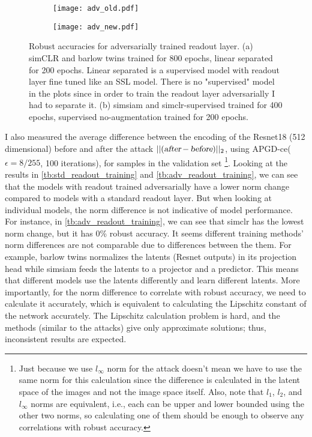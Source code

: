 \documentclass[../thesis.tex]{subfiles}
\begin{document}
	\begin{figure}[h!]
		\centering
		\begin{subfigure}{.5\textwidth}
			\centering
			\texttt{[image: adv\_old.pdf]}
			\caption{}
			\label{fig:sub1}
		\end{subfigure}%
		\begin{subfigure}{.5\textwidth}
			\centering
			\texttt{[image: adv\_new.pdf]}
			\caption{}
			\label{fig:sub2}
		\end{subfigure}
		\caption[Caption for LOF]{Robust accuracies for adversarially trained readout layer. (a) simCLR and barlow twins trained for 800 epochs, linear separated for 200 epochs. Linear separated is a supervised model with readout layer fine tuned like an SSL model. There is no "supervised" model in the plots since in order to train the readout layer adversarially I had to separate it. (b) simsiam and simclr-supervised trained for 400 epochs, supervised no-augmentation trained for 200 epochs.}
		\label{fig:adv_readout_training}
	\end{figure}
	
	I also measured the average difference between the encoding of the Resnet18 (512 dimensional) before and after the attack $||(\variablename{after}-\variablename{before} )||_2$, using APGD-ce($\epsilon=8/255$, 100 iterations), for samples in the validation set 
	\footnote{Just because we use $l_{\infty}$ norm for the attack doesn't mean we have to use the same norm for this calculation since the difference is calculated in the latent space of the images and not the image space itself. Also, note that $l_1$, $l_2$, and $l_{\infty}$ norms are equivalent, i.e., each can be upper and lower bounded using the other two norms, so calculating one of them should be enough to observe any correlations with robust accuracy.}. 
	Looking at the results in \ref{tb:std_readout_training} and \ref{tb:adv_readout_training}, we can see that the models with readout trained adversarially have a lower norm change compared to models with a standard readout layer. But when looking at individual models, the norm difference is not indicative of model performance. For instance, in \ref{tb:adv_readout_training}, we can see that simclr has the lowest norm change, but it has 0\% robust accuracy. It seems different training methods' norm differences are not comparable due to differences between the them. For example, barlow twins normalizes the latents (Resnet outputs) in its projection head while simsiam feeds the latents to a projector and a predictor. This means that different models use the latents differently and learn different latents. More importantly, for the norm difference to correlate with robust accuracy, we need to calculate it accurately, which is equivalent to calculating the Lipschitz constant of the network accurately. The Lipschitz calculation problem is hard, and the methods (similar to the attacks) give only approximate solutions; thus, inconsistent results are expected.    
	
\end{document}
